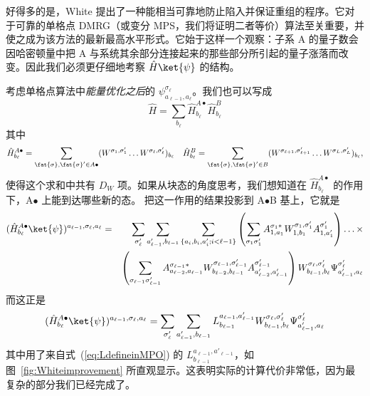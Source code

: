 好得多的是，White \cite{White05} 提出了一种能相当可靠地防止陷入并保证重组的程序。它对于可靠的单格点 DMRG（或变分 MPS，我们将证明二者等价）算法至关重要，并使之成为该方法的最新最高水平形式。它始于这样一个观察：子系 A 的量子数会因哈密顿量中把 A 与系统其余部分连接起来的那些部分所引起的量子涨落而改变。因此我们必须更仔细地考察 $\hat{H}\ket{\psi}$ 的结构。

考虑单格点算法中{\em 能量优化之后}的 $\psi^{\sigma_{\ell}}_{a_{\ell-1},a_{\ell}}$。我们也可以写成
\begin{equation}
\hat{H} = \sum_{b_{\ell}} \hat{H}^{A\bullet}_{b_{\ell}} \hat{H}^B_{b_{\ell}}
\end{equation}
其中
\begin{equation}
\hat{H}^{A\bullet}_{b_{\ell}} = \sum_{\fat{\sigma}, \fat{\sigma}'\in A\bullet} ( W^{\sigma_1,\sigma'_1} \ldots W^{\sigma_{\ell},\sigma'_{\ell}} )_{b_{\ell}} \quad
\hat{H}^B_{b_{\ell}} = \sum_{\fat{\sigma}, \fat{\sigma}'\in B} ( W^{\sigma_{\ell+1},\sigma'_{\ell+1}} \ldots W^{\sigma_L,\sigma'_L} )_{b_{\ell}} ,
\end{equation}
使得这个求和中共有 $D_W$ 项。如果从块态的角度思考，我们想知道在 $\hat{H}^{A\bullet}_{b_{\ell}}$ 的作用下，A$\bullet$ 上能到达哪些新的态。
把这一作用的结果投影到 A$\bullet$B 基上，它就是
\begin{eqnarray}
(\hat{H}^{A\bullet}_{b_{\ell}} \ket{\psi})^{a_{\ell-1}, \sigma_{\ell},a_{\ell}} &=&
\sum_{\sigma'_{\ell}} \sum_{a'_{\ell-1},b_{\ell-1}} \sum_{\{ a_i, b_i, a'_i; i<\ell-1\} } \left( \sum_{\sigma_1\sigma'_1} A^{\sigma_1*}_{1,a_1} W^{\sigma_1,\sigma'_1}_{1,b_1} A^{\sigma'_1}_{1,a'_1} \right) \ldots \times \nonumber \\
& & \left( \sum_{\sigma_{\ell-1}\sigma'_{\ell-1}} A^{\sigma_{\ell-1} *}_{a_{\ell-2},a_{\ell-1}} W^{\sigma_{\ell-1},\sigma'_{\ell-1}}_{b_{\ell-2},b_{\ell-1}} A^{\sigma'_{\ell-1}}_{a'_{\ell-2},a'_{\ell-1}} \right)  W^{\sigma_{\ell},\sigma'_{\ell}}_{b_{\ell-1},b_{\ell}} \Psi^{\sigma'_{\ell}}_{a'_{\ell-1},a_{\ell}}
\end{eqnarray}
而这正是
\begin{equation}
(\hat{H}^{A\bullet}_{b_{\ell}} \ket{\psi})^{a_{\ell-1}, \sigma_{\ell},a_{\ell}} =
\sum_{\sigma'_{\ell}} \sum_{a'_{\ell-1},b_{\ell-1}}
L^{a_{\ell-1},a'_{\ell-1}}_{b_{\ell-1}} W^{\sigma_{\ell},\sigma'_{\ell}}_{b_{\ell-1},b_{\ell}} \Psi^{\sigma'_{\ell}}_{a'_{\ell-1},a_{\ell}}
\end{equation}
其中用了来自式~(\ref{eq:LdefineinMPO}) 的 $L^{a_{\ell-1},a'_{\ell-1}}_{b_{\ell-1}}$，如图~\ref{fig:Whiteimprovement} 所直观显示。这表明实际的计算代价非常低，因为最复杂的部分我们已经完成了。

